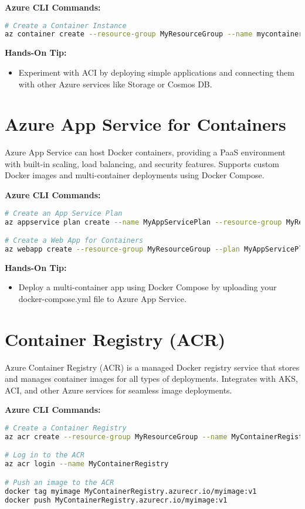 \documentclass{article}
\begin{document}
\textbf{Azure CLI Commands:}
\begin{lstlisting}[language=bash]
# Create a Container Instance
az container create --resource-group MyResourceGroup --name mycontainer --image mcr.microsoft.com/azuredocs/aci-helloworld --dns-name-label mycontainerdemo --ports 80
\end{lstlisting}

\textbf{Hands-On Tip:}
\begin{itemize}
    \item Experiment with ACI by deploying simple applications and connecting them with other Azure services like Storage or Cosmos DB.
\end{itemize}

\section{Azure App Service for Containers}
Azure App Service can host Docker containers, providing a PaaS environment with built-in scaling, load balancing, and security features. Supports custom Docker images and multi-container deployments using Docker Compose.

\textbf{Azure CLI Commands:}
\begin{lstlisting}[language=bash]
# Create an App Service Plan
az appservice plan create --name MyAppServicePlan --resource-group MyResourceGroup --is-linux --sku B1

# Create a Web App for Containers
az webapp create --resource-group MyResourceGroup --plan MyAppServicePlan --name MyContainerApp --deployment-container-image-name mcr.microsoft.com/dotnet/samples:aspnetapp
\end{lstlisting}

\textbf{Hands-On Tip:}
\begin{itemize}
    \item Deploy a multi-container app using Docker Compose by uploading your docker-compose.yml file to Azure App Service.
\end{itemize}

\section{Container Registry (ACR)}
Azure Container Registry (ACR) is a managed Docker registry service that stores and manages container images for all types of deployments. Integrates with AKS, ACI, and other Azure services for seamless image deployments.

\textbf{Azure CLI Commands:}
\begin{lstlisting}[language=bash]
# Create a Container Registry
az acr create --resource-group MyResourceGroup --name MyContainerRegistry --sku Basic

# Log in to the ACR
az acr login --name MyContainerRegistry

# Push an image to the ACR
docker tag myimage MyContainerRegistry.azurecr.io/myimage:v1
docker push MyContainerRegistry.azurecr.io/myimage:v1
\end{lstlisting}
\end{document}
